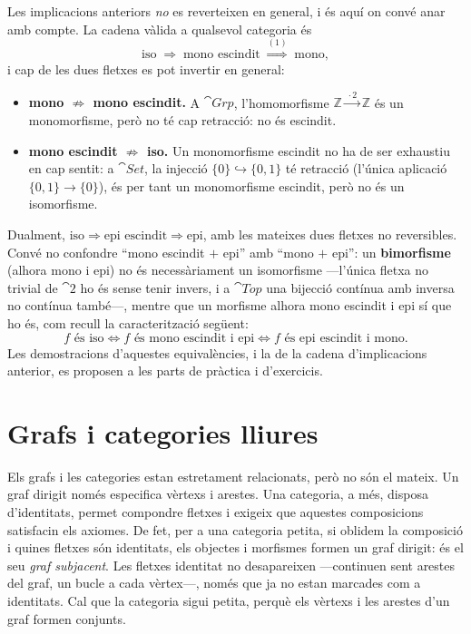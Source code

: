 Les implicacions anteriors \emph{no} es reverteixen en general, i és aquí on convé anar amb compte. La cadena vàlida a qualsevol categoria és
\[
\text{iso} \;\Longrightarrow\; \text{mono escindit} \;\overset{(1)}{\Longrightarrow}\; \text{mono},
\]
i cap de les dues fletxes es pot invertir en general:
\begin{itemize}
\item[(1)] \textbf{mono $\not\Rightarrow$ mono escindit.} A $\cat{Grp}$, l'homomorfisme $\mathbb{Z}\xrightarrow{\,\cdot 2\,}\mathbb{Z}$ és un monomorfisme, però no té cap retracció: no és escindit.
\item[(2)] \textbf{mono escindit $\not\Rightarrow$ iso.} Un monomorfisme escindit no ha de ser exhaustiu en cap sentit: a $\cat{Set}$, la injecció $\{0\}\hookrightarrow\{0,1\}$ té retracció (l'única aplicació $\{0,1\}\to\{0\}$), és per tant un monomorfisme escindit, però no és un isomorfisme.
\end{itemize}
Dualment, $\text{iso}\Rightarrow\text{epi escindit}\Rightarrow\text{epi}$, amb les mateixes dues fletxes no reversibles. Convé no confondre \enquote{mono escindit $+$ epi} amb \enquote{mono $+$ epi}: un \textbf{bimorfisme} (alhora mono i epi) no és necessàriament un isomorfisme ---l'única fletxa no trivial de $\cat{2}$ ho és sense tenir invers, i a $\cat{Top}$ una bijecció contínua amb inversa no contínua també---, mentre que un morfisme alhora mono escindit i epi sí que ho és, com recull la caracterització següent:
\[
f \text{ és iso} \iff f \text{ és mono escindit i epi} \iff f \text{ és epi escindit i mono}.
\]
Les demostracions d'aquestes equivalències, i la de la cadena d'implicacions anterior, es proposen a les parts de pràctica i d'exercicis.

\section{Grafs i categories lliures}\label{sec:grafs-lliures}

Els grafs i les categories estan estretament relacionats, però no són el mateix. Un graf dirigit només especifica vèrtexs i arestes. Una categoria, a més, disposa d'identitats, permet compondre fletxes i exigeix que aquestes composicions satisfacin els axiomes. De fet, per a una categoria petita, si oblidem la composició i quines fletxes són identitats, els objectes i morfismes formen un graf dirigit: és el seu \emph{graf subjacent}. Les fletxes identitat no desapareixen ---continuen sent arestes del graf, un bucle a cada vèrtex---, només que ja no estan marcades com a identitats. Cal que la categoria sigui petita, perquè els vèrtexs i les arestes d'un graf formen conjunts.

